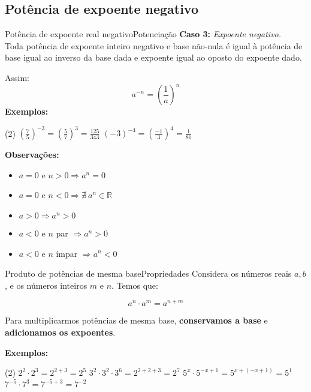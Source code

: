 \documentclass[aspectratio=169,10pt]{uu-beamer}
\begin{document}
\subsection{Potência de expoente negativo}
    \begin{frame}{Potência de expoente real negativo}{Potenciação}
        \textbf{Caso 3:} \textit{Expoente negativo.}
            \vspace{.1cm} 
            \\
            Toda potência de expoente inteiro negativo e base não-nula é igual à potência de base igual ao inverso da base dada e expoente igual ao oposto do expoente dado.
            
            Assim:
                \[ a^{-n} = \left( \frac{1}{a} \right)^n \]
            \textbf{Exemplos:}
                \begin{tasks}(2)
                    \task \( \left( \frac{7}{5} \right)^{-3} = \left( \frac{5}{7} \right)^{3} = \frac{125}{343}\)
                    \task \( \left( -3 \right)^{-4} = \left( \frac{-1}{3} \right)^4 = \frac{1}{81} \)
                \end{tasks}
                \vspace{.3cm}
\pause
            \textbf{Observações:}
                \begin{multicols}{2}
                \begin{itemize}
                    \item \(a = 0\) e \( n > 0 \Rightarrow a^n = 0\)
                    \item \(a = 0\) e \( n < 0 \Rightarrow \nexists~ a^n \in \mathbb{R}\)
                    \item \(a > 0 \Rightarrow a^n > 0\)
                    \item \( a < 0\) e \(n\) par \(\Rightarrow a^n > 0\)
                    \item \(a < 0\) e \(n\) ímpar \(\Rightarrow a^n < 0\)
                \end{itemize}
                \end{multicols}
    \end{frame}
    
    \begin{frame}{Produto de potências de mesma base}{Propriedades}
        Considera os números reais \(a,b\), e os números inteiros \(m\) e \(n\). Temos que:
        
        \[a^n \cdot a^m = a^{n + m}\]
        
        Para multiplicarmos potências de mesma base, \textbf{conservamos a base} e \textbf{adicionamos os expoentes}.
        \vspace{.5cm}
        
        \textbf{Exemplos:}
        
        \begin{tasks}(2)
            \task \(2^2 \cdot 2^3 = 2^{2+3} = 2^5\)
            \task \(3^2 \cdot 3^2 \cdot 3^6 = 2^{2+2+3} = 2^7\)
            \task \(5^x \cdot 5^{-x+1} = 5^{x + (-x+1)} = 5^1\)
            \task \(7^{-5} \cdot 7^{3} = 7^{-5+3} = 7^{-2}\)
        \end{tasks}
        
    \end{frame}
    
\end{document}

